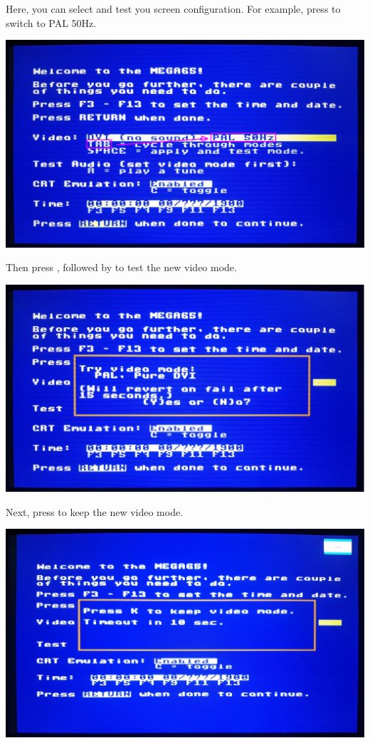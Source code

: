 Here, you can select and test you screen configuration. For example, press  to switch to PAL 50Hz.

\begin{center}
  \includegraphics[width=\linewidth]{images/img011_final_boot_02.png}
\end{center}

Then press  , followed by  to test the new video mode.

\begin{center}
  \includegraphics[width=\linewidth]{images/img011_final_boot_03.jpg}
\end{center}

Next, press  to keep the new video mode.

\begin{center}
  \includegraphics[width=\linewidth]{images/img011_final_boot_04.jpg}
\end{center}

